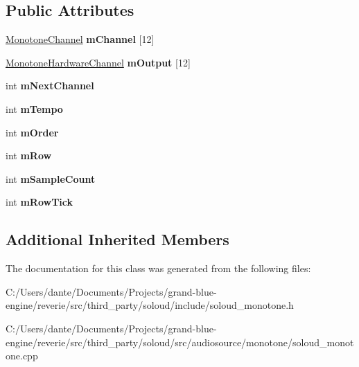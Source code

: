 \subsection*{Public Attributes}
\begin{DoxyCompactItemize}
\item 
\mbox{\label{class_so_loud_1_1_monotone_instance_aee1f7fef30f3e01220ab83e5fa4b180d}} 
\mbox{\hyperlink{struct_so_loud_1_1_monotone_channel}{Monotone\+Channel}} {\bfseries m\+Channel} \mbox{[}12\mbox{]}
\item 
\mbox{\label{class_so_loud_1_1_monotone_instance_adbd0e6190fa7dcc58ff274dd3c9ad140}} 
\mbox{\hyperlink{struct_so_loud_1_1_monotone_hardware_channel}{Monotone\+Hardware\+Channel}} {\bfseries m\+Output} \mbox{[}12\mbox{]}
\item 
\mbox{\label{class_so_loud_1_1_monotone_instance_a65539fbb341b2155d6f1436d72803a66}} 
int {\bfseries m\+Next\+Channel}
\item 
\mbox{\label{class_so_loud_1_1_monotone_instance_ab4153fbdbda4044eef0954f16ad3941f}} 
int {\bfseries m\+Tempo}
\item 
\mbox{\label{class_so_loud_1_1_monotone_instance_a8ff38937462eef3eb6ac406659d5265e}} 
int {\bfseries m\+Order}
\item 
\mbox{\label{class_so_loud_1_1_monotone_instance_abed652b9aada3dd2dc3bd3d570ab1fba}} 
int {\bfseries m\+Row}
\item 
\mbox{\label{class_so_loud_1_1_monotone_instance_a73cf22d769dc5ff543850b5913775c5b}} 
int {\bfseries m\+Sample\+Count}
\item 
\mbox{\label{class_so_loud_1_1_monotone_instance_ae9b7bff2b72639e579c154be1da031a2}} 
int {\bfseries m\+Row\+Tick}
\end{DoxyCompactItemize}
\subsection*{Additional Inherited Members}


The documentation for this class was generated from the following files\+:\begin{DoxyCompactItemize}
\item 
C\+:/\+Users/dante/\+Documents/\+Projects/grand-\/blue-\/engine/reverie/src/third\+\_\+party/soloud/include/soloud\+\_\+monotone.\+h\item 
C\+:/\+Users/dante/\+Documents/\+Projects/grand-\/blue-\/engine/reverie/src/third\+\_\+party/soloud/src/audiosource/monotone/soloud\+\_\+monotone.\+cpp\end{DoxyCompactItemize}

